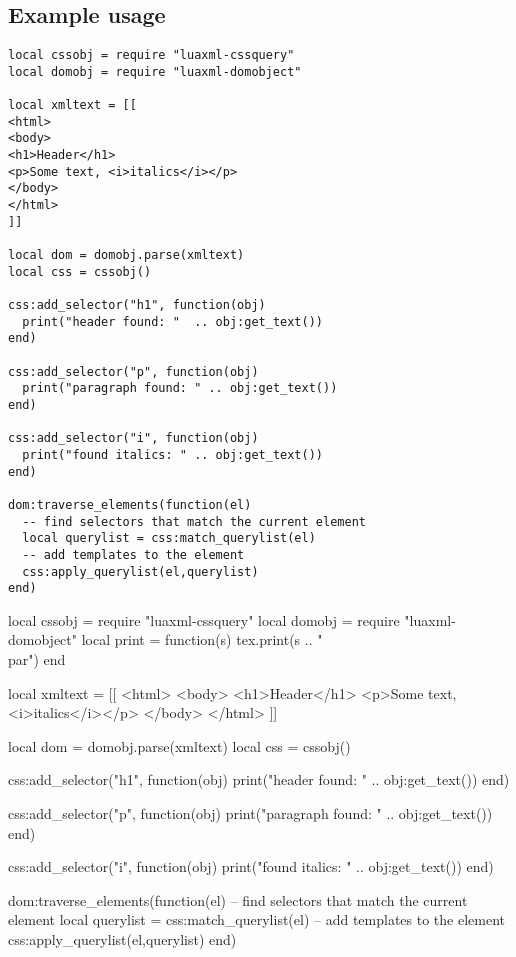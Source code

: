 \documentclass{ltxdoc}
\begin{document}
\subsection{Example usage}

\begin{verbatim}
local cssobj = require "luaxml-cssquery"
local domobj = require "luaxml-domobject"

local xmltext = [[
<html>
<body>
<h1>Header</h1>
<p>Some text, <i>italics</i></p>
</body>
</html>
]]

local dom = domobj.parse(xmltext)
local css = cssobj()

css:add_selector("h1", function(obj)
  print("header found: "  .. obj:get_text())
end)

css:add_selector("p", function(obj)
  print("paragraph found: " .. obj:get_text())
end)

css:add_selector("i", function(obj)
  print("found italics: " .. obj:get_text())
end)

dom:traverse_elements(function(el)
  -- find selectors that match the current element
  local querylist = css:match_querylist(el)
  -- add templates to the element
  css:apply_querylist(el,querylist)
end)
\end{verbatim}

\begin{framed}
  \begin{luacode*}
local cssobj = require "luaxml-cssquery"
local domobj = require "luaxml-domobject"
local print = function(s) tex.print(s .. "\\par") end

local xmltext = [[
<html>
<body>
<h1>Header</h1>
<p>Some text, <i>italics</i></p>
</body>
</html>
]]

local dom = domobj.parse(xmltext)
local css = cssobj()

css:add_selector("h1", function(obj)
  print("header found: "  .. obj:get_text())
end)

css:add_selector("p", function(obj)
  print("paragraph found: " .. obj:get_text())
end)

css:add_selector("i", function(obj)
  print("found italics: " .. obj:get_text())
end)

dom:traverse_elements(function(el)
  -- find selectors that match the current element
  local querylist = css:match_querylist(el)
  -- add templates to the element
  css:apply_querylist(el,querylist)
end)
  \end{luacode*}
\end{framed}
\end{document}
